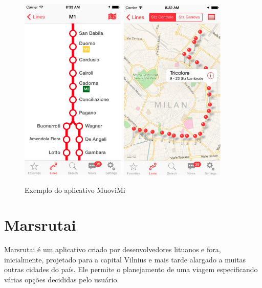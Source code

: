 \begin{figure}[htp]
\begin{center}
  \includegraphics[width=5cm]{images/MuoviMI.png}
    \includegraphics[width=5cm]{images/MuoviMI2.png}
  \caption{Exemplo do aplicativo MuoviMi}
  \label{fig:exampleMuoviMi}
\end{center}
\end{figure}

\section{Marsrutai}

Marsrutai é um aplicativo criado por desenvolvedores  lituanos e fora, inicialmente, projetado para a capital Vilnius e mais tarde alargado a muitas outras cidades do país. Ele permite o planejamento de uma viagem  especificando várias opções decididas pelo usuário. 

